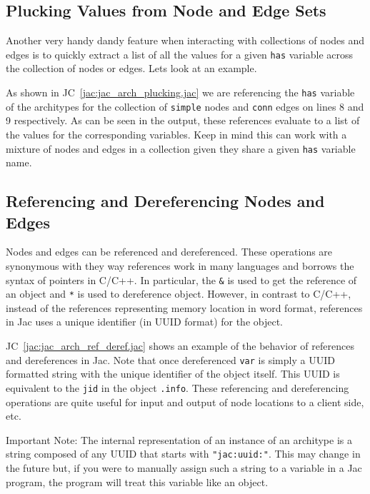 \subsection{Plucking Values from Node and Edge Sets}

Another very handy dandy feature when interacting with collections of nodes and edges is to quickly extract a list of all the values for a given \lstinline{has} variable across the collection of nodes or edges. Lets look at an example.
\par
{}
\par
{}
\par
As shown in JC~\ref{jac:jac_arch_plucking.jac} we are referencing the \lstinline{has} variable of the architypes for the collection of \lstinline{simple} nodes and \lstinline{conn} edges on lines 8 and 9 respectively. As can be seen in the output, these references evaluate to a list of the values for the corresponding variables. Keep in mind this can work with a mixture of nodes and edges in a collection given they share a given \lstinline{has} variable name.

\subsection{Referencing and Dereferencing Nodes and Edges}

Nodes and edges can be referenced and dereferenced.
These operations are synonymous with they way references work in many languages and borrows the syntax of pointers in C/C++.
In particular, the \lstinline{&} is used to get the reference of an object and \lstinline{*} is used to dereference object.
However, in contrast to C/C++, instead of the references representing memory location in word format, references in Jac uses a unique identifier (in UUID format) for the object.
\par
{}
\par
{}
\par
JC~\ref{jac:jac_arch_ref_deref.jac} shows an example of the behavior of references and dereferences in Jac.
Note that once dereferenced \lstinline{var} is simply a UUID formatted string with the unique identifier of the object itself.
This UUID is equivalent to the \lstinline{jid} in the object \lstinline{.info}.
These referencing and dereferencing operations are quite useful for input and output of node locations to a client side, etc.
\begin{nerd}
    Important Note: The internal representation of an instance of an architype is a string composed of any UUID that starts with \lstinline{"jac:uuid:"}. This may change in the future but, if you were to manually assign such a string to a variable in a Jac program, the program will treat this variable like an object.
\end{nerd}

